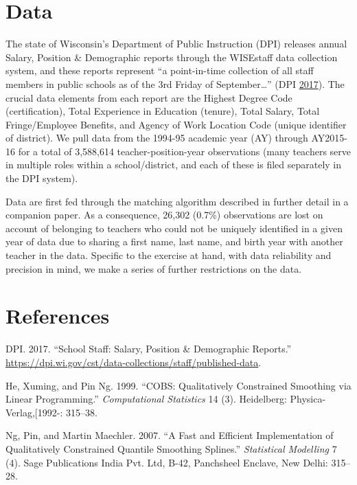 \documentclass[]{article}
\begin{document}
\section{Data}\label{data}

The state of Wisconsin's Department of Public Instruction (DPI) releases
annual Salary, Position \& Demographic reports through the WISEstaff
data collection system, and these reports represent ``a point-in-time
collection of all staff members in public schools as of the 3rd Friday
of September\ldots{}'' (DPI \protect\hyperlink{ref-dpi}{2017}). The
crucial data elements from each report are the Highest Degree Code
(certification), Total Experience in Education (tenure), Total Salary,
Total Fringe/Employee Benefits, and Agency of Work Location Code (unique
identifier of district). We pull data from the 1994-95 academic year
(AY) through AY2015-16 for a total of 3,588,614 teacher-position-year
observations (many teachers serve in multiple roles within a
school/district, and each of these is filed separately in the DPI
system).

Data are first fed through the matching algorithm described in further
detail in a companion paper. As a consequence, 26,302 (0.7\%)
observations are lost on account of belonging to teachers who could not
be uniquely identified in a given year of data due to sharing a first
name, last name, and birth year with another teacher in the data.
Specific to the exercise at hand, with data reliability and precision in
mind, we make a series of further restrictions on the data.

\section{References}\label{references}



\hypertarget{refs}{}
\hypertarget{ref-dpi}{}
DPI. 2017. ``School Staff: Salary, Position \& Demographic Reports.''
\url{https://dpi.wi.gov/cst/data-collections/staff/published-data}.

\hypertarget{ref-he}{}
He, Xuming, and Pin Ng. 1999. ``COBS: Qualitatively Constrained
Smoothing via Linear Programming.'' \emph{Computational Statistics} 14
(3). Heidelberg: Physica-Verlag,{[}1992-: 315--38.

\hypertarget{ref-ng}{}
Ng, Pin, and Martin Maechler. 2007. ``A Fast and Efficient
Implementation of Qualitatively Constrained Quantile Smoothing
Splines.'' \emph{Statistical Modelling} 7 (4). Sage Publications India
Pvt. Ltd, B-42, Panchsheel Enclave, New Delhi: 315--28.
\end{document}
